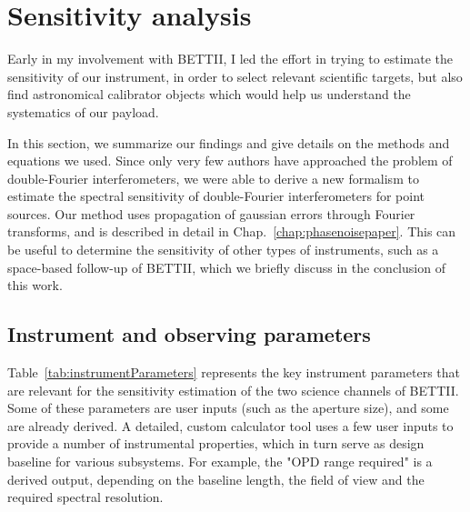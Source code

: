 \section{Sensitivity analysis}

Early in my involvement with BETTII, I led the effort in trying to estimate the sensitivity of our instrument, in order to select relevant scientific targets, but also find astronomical calibrator objects which would help us understand the systematics of our payload.

In this section, we summarize our findings and give details on the methods and equations we used. Since only very few authors have approached the problem of double-Fourier interferometers, we were able to derive a new formalism to estimate the spectral sensitivity of double-Fourier interferometers for point sources. Our method uses propagation of gaussian errors through Fourier transforms, and is described in detail in Chap.~\ref{chap:phasenoisepaper}. This can be useful to determine the sensitivity of other types of instruments, such as a space-based follow-up of BETTII, which we briefly discuss in the conclusion of this work.

\subsection{Instrument and observing parameters}

Table~\ref{tab:instrumentParameters} represents the key instrument parameters that are relevant for the sensitivity estimation of the two science channels of BETTII. Some of these parameters are user inputs (such as the aperture size), and some are already derived. A detailed, custom calculator tool uses a few user inputs to provide a number of instrumental properties, which in turn serve as design baseline for various subsystems. For example, the "OPD range required" is a derived output, depending on the baseline length, the field of view and the required spectral resolution.


